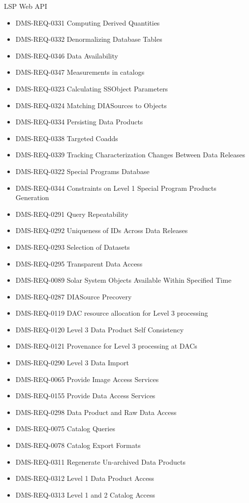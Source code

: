 LSP Web API \begin{itemize}
\item DMS-REQ-0331 Computing Derived Quantities
\item DMS-REQ-0332 Denormalizing Database Tables
\item DMS-REQ-0346 Data Availability
\item DMS-REQ-0347 Measurements in catalogs
\item DMS-REQ-0323 Calculating SSObject Parameters
\item DMS-REQ-0324 Matching DIASources to Objects
\item DMS-REQ-0334 Persisting Data Products
\item DMS-REQ-0338 Targeted Coadds
\item DMS-REQ-0339 Tracking Characterization Changes Between Data Releases
\item DMS-REQ-0322 Special Programs Database
\item DMS-REQ-0344 Constraints on Level 1 Special Program Products Generation
\item DMS-REQ-0291 Query Repeatability
\item DMS-REQ-0292 Uniqueness of IDs Across Data Releases
\item DMS-REQ-0293 Selection of Datasets
\item DMS-REQ-0295 Transparent Data Access
\item DMS-REQ-0089 Solar System Objects Available Within Specified Time
\item DMS-REQ-0287 DIASource Precovery
\item DMS-REQ-0119 DAC resource allocation for Level 3 processing
\item DMS-REQ-0120 Level 3 Data Product Self Consistency
\item DMS-REQ-0121 Provenance for Level 3 processing at DACs
\item DMS-REQ-0290 Level 3 Data Import
\item DMS-REQ-0065 Provide Image Access Services
\item DMS-REQ-0155 Provide Data Access Services
\item DMS-REQ-0298 Data Product and Raw Data Access
\item DMS-REQ-0075 Catalog Queries
\item DMS-REQ-0078 Catalog Export Formats
\item DMS-REQ-0311 Regenerate Un-archived Data Products
\item DMS-REQ-0312 Level 1 Data Product Access
\item DMS-REQ-0313 Level 1 and 2 Catalog Access

\end{itemize}
